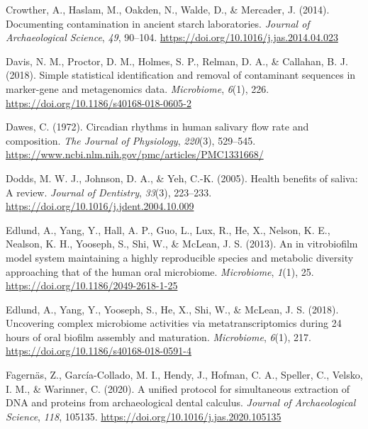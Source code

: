 \documentclass[
  letterpaper,
]{book}
\newlength{\cslhangindent}
\newlength{\cslentryspacingunit} %
\newenvironment{CSLReferences}[2] %
 {%
  \setlength{\parindent}{0pt}
  \ifodd #1
  \let\oldpar\par
  \def\par{\hangindent=\cslhangindent\oldpar}
  \fi
  \setlength{\parskip}{#2\cslentryspacingunit}
 }%
 {}
\begin{document}
\begin{CSLReferences}{1}{0}
\leavevmode{}%
Crowther, A., Haslam, M., Oakden, N., Walde, D., \& Mercader, J. (2014).
Documenting contamination in ancient starch laboratories. \emph{Journal
of Archaeological Science}, \emph{49}, 90--104.
\url{https://doi.org/10.1016/j.jas.2014.04.023}

\leavevmode{}%
Davis, N. M., Proctor, D. M., Holmes, S. P., Relman, D. A., \& Callahan,
B. J. (2018). Simple statistical identification and removal of
contaminant sequences in marker-gene and metagenomics data.
\emph{Microbiome}, \emph{6}(1), 226.
\url{https://doi.org/10.1186/s40168-018-0605-2}

\leavevmode{}%
Dawes, C. (1972). Circadian rhythms in human salivary flow rate and
composition. \emph{The Journal of Physiology}, \emph{220}(3), 529--545.
\url{https://www.ncbi.nlm.nih.gov/pmc/articles/PMC1331668/}

\leavevmode{}%
Dodds, M. W. J., Johnson, D. A., \& Yeh, C.-K. (2005). Health benefits
of saliva: A review. \emph{Journal of Dentistry}, \emph{33}(3),
223--233. \url{https://doi.org/10.1016/j.jdent.2004.10.009}

\leavevmode{}%
Edlund, A., Yang, Y., Hall, A. P., Guo, L., Lux, R., He, X., Nelson, K.
E., Nealson, K. H., Yooseph, S., Shi, W., \& McLean, J. S. (2013). An in
vitrobiofilm model system maintaining a highly reproducible species and
metabolic diversity approaching that of the human oral microbiome.
\emph{Microbiome}, \emph{1}(1), 25.
\url{https://doi.org/10.1186/2049-2618-1-25}

\leavevmode{}%
Edlund, A., Yang, Y., Yooseph, S., He, X., Shi, W., \& McLean, J. S.
(2018). Uncovering complex microbiome activities via metatranscriptomics
during 24 hours of oral biofilm assembly and maturation.
\emph{Microbiome}, \emph{6}(1), 217.
\url{https://doi.org/10.1186/s40168-018-0591-4}

\leavevmode{}%
Fagernäs, Z., García-Collado, M. I., Hendy, J., Hofman, C. A., Speller,
C., Velsko, I. M., \& Warinner, C. (2020). A unified protocol for
simultaneous extraction of {DNA} and proteins from archaeological dental
calculus. \emph{Journal of Archaeological Science}, \emph{118}, 105135.
\url{https://doi.org/10.1016/j.jas.2020.105135}


\end{CSLReferences}
\end{document}
